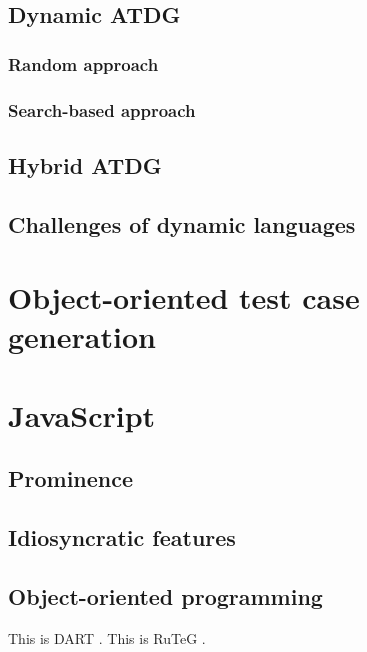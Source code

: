 \documentclass[a4paper,11pt,titlepage]{report}
\begin{document}
\subsection{Dynamic ATDG}
\subsubsection{Random approach}
\subsubsection{Search-based approach}

\subsection{Hybrid ATDG}

\subsection{Challenges of dynamic languages}

\section{Object-oriented test case generation}

\section{JavaScript}
\subsection{Prominence}
\subsection{Idiosyncratic features}
\subsection{Object-oriented programming}

This is DART \cite{godefroid2005dart}. This is RuTeG \cite{mairhofer2008search}.


\end{document}
